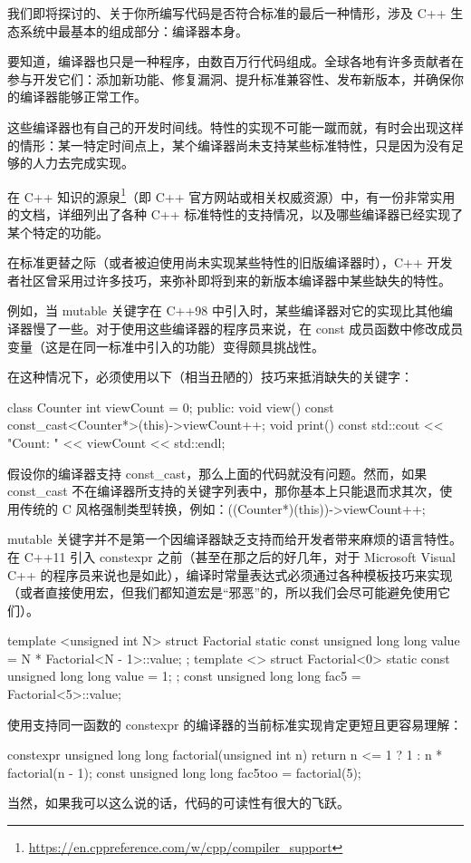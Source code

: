 我们即将探讨的、关于你所编写代码是否符合标准的最后一种情形，涉及 C++ 生态系统中最基本的组成部分：编译器本身。

要知道，编译器也只是一种程序，由数百万行代码组成。全球各地有许多贡献者在参与开发它们：添加新功能、修复漏洞、提升标准兼容性、发布新版本，并确保你的编译器能够正常工作。

这些编译器也有自己的开发时间线。特性的实现不可能一蹴而就，有时会出现这样的情形：某一特定时间点上，某个编译器尚未支持某些标准特性，只是因为没有足够的人力去完成实现。

在 C++ 知识的源泉\footnote{\url{https://en.cppreference.com/w/cpp/compiler_support}}（即 C++ 官方网站或相关权威资源）中，有一份非常实用的文档，详细列出了各种 C++ 标准特性的支持情况，以及哪些编译器已经实现了某个特定的功能。

在标准更替之际（或者被迫使用尚未实现某些特性的旧版编译器时），C++ 开发者社区曾采用过许多技巧，来弥补即将到来的新版本编译器中某些缺失的特性。

例如，当 mutable 关键字在 C++98 中引入时，某些编译器对它的实现比其他编译器慢了一些。对于使用这些编译器的程序员来说，在 const 成员函数中修改成员变量（这是在同一标准中引入的功能）变得颇具挑战性。

在这种情况下，必须使用以下（相当丑陋的）技巧来抵消缺失的关键字：

\begin{cpp}
class Counter {
  int viewCount = 0;
public:
  void view() const {
    const_cast<Counter*>(this)->viewCount++;
  }
  void print() const {
    std::cout << "Count: " << viewCount << std::endl;
  }
}
\end{cpp}

假设你的编译器支持 const\_cast，那么上面的代码就没有问题。然而，如果 const\_cast 不在编译器所支持的关键字列表中，那你基本上只能退而求其次，使用传统的 C 风格强制类型转换，例如：((Counter*)(this))->viewCount++; 

mutable 关键字并不是第一个因编译器缺乏支持而给开发者带来麻烦的语言特性。在 C++11 引入 constexpr 之前（甚至在那之后的好几年，对于 Microsoft Visual C++ 的程序员来说也是如此），编译时常量表达式必须通过各种模板技巧来实现（或者直接使用宏，但我们都知道宏是“邪恶”的，所以我们会尽可能避免使用它们）。

\begin{cpp}
template <unsigned int N>
struct Factorial {
  static const unsigned long long value = N * Factorial<N - 1>::value;
};
template <>
struct Factorial<0> {
  static const unsigned long long value = 1;
};
const unsigned long long fac5 = Factorial<5>::value;
\end{cpp}

使用支持同一函数的 constexpr 的编译器的当前标准实现肯定更短且更容易理解：

\begin{cpp}
constexpr unsigned long long factorial(unsigned int n) {
  return n <= 1 ? 1 : n * factorial(n - 1);
}
const unsigned long long fac5too = factorial(5);
\end{cpp}

当然，如果我可以这么说的话，代码的可读性有很大的飞跃。






















